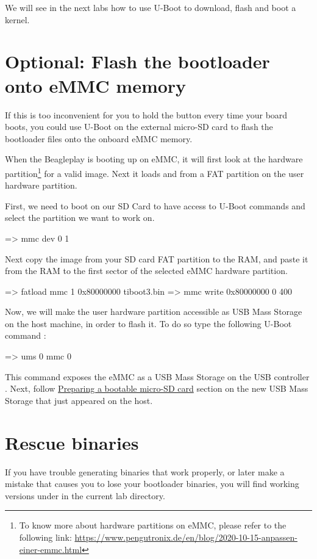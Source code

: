 We will see in the next labs how to use U-Boot to download, flash and
boot a kernel.

\section{Optional: Flash the bootloader onto eMMC memory}
If this is too inconvenient for you to hold the 
button every time your board boots, you could use U-Boot on the external
micro-SD card to flash the bootloader files onto the onboard eMMC memory.

When the Beagleplay is booting up on eMMC, it will first look at the
 hardware partition\footnote{To know more about hardware partitions
on eMMC, please refer to the following link:
\url{https://www.pengutronix.de/en/blog/2020-10-15-anpassen-einer-emmc.html}}
for a valid  image.
Next it loads  and  from a FAT partition on the
user hardware partition.

First, we need to boot on our SD Card to have access to U-Boot commands and
select the  partition we want to work on.

\begin{ubootinput}
  => mmc dev 0 1
\end{ubootinput}

Next copy the  image from your SD card FAT partition to the RAM,
and paste it from the RAM to the first sector of the selected eMMC hardware
partition.

\begin{ubootinput}
  => fatload mmc 1 0x80000000 tiboot3.bin
  => mmc write 0x80000000 0 400
\end{ubootinput}

Now, we will make the user hardware partition accessible as USB Mass Storage
on the host machine, in order to flash it. To do so type the following
 U-Boot command :
\begin{ubootinput}
  => ums 0 mmc 0
\end{ubootinput}
This command exposes the eMMC  as a USB Mass Storage on the USB
controller .
Next, follow \hyperref[sec:Prepboot]{Preparing a bootable micro-SD card} section
on the new USB Mass Storage that just appeared on the host.

\section{Rescue binaries}

If you have trouble generating binaries that work properly, or later
make a mistake that causes you to lose your bootloader binaries, you
will find working versions under  in the current lab
directory.
